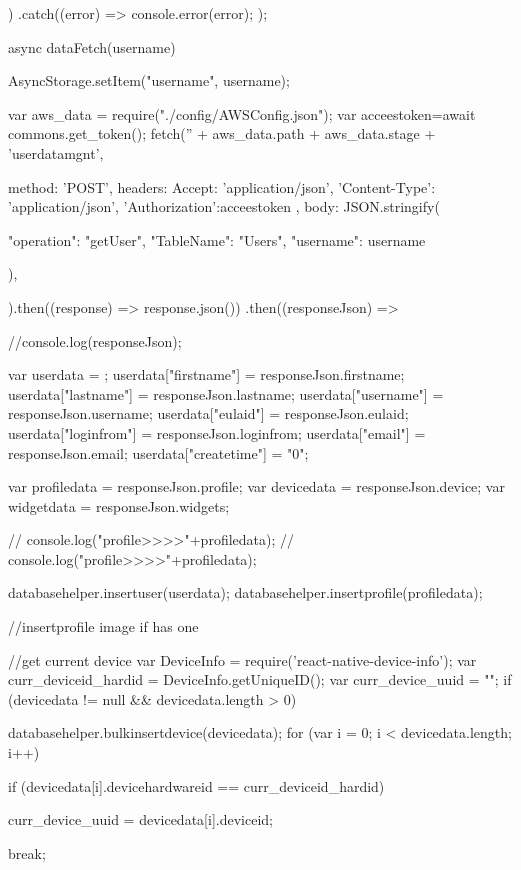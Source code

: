 {{{{{      })
      .catch((error) => {
        console.error(error);
      });
  }

  async dataFetch(username) {

    AsyncStorage.setItem("username", username);

    var aws_data = require("./config/AWSConfig.json");
    var acceestoken=await commons.get_token();
    fetch('' + aws_data.path + aws_data.stage + 'userdatamgnt', {
      method: 'POST',
      headers: {
        Accept: 'application/json',
        'Content-Type': 'application/json',
        'Authorization':acceestoken
      },
      body: JSON.stringify({

        "operation": "getUser",
        "TableName": "Users",
        "username": username

      }),
    }).then((response) => response.json())
      .then((responseJson) => {


        //console.log(responseJson);

        var userdata = {};
        userdata["firstname"] = responseJson.firstname;
        userdata["lastname"] = responseJson.lastname;
        userdata["username"] = responseJson.username;
        userdata["eulaid"] = responseJson.eulaid;
        userdata["loginfrom"] = responseJson.loginfrom;
        userdata["email"] = responseJson.email;
        userdata["createtime"] = "0";


        var profiledata = responseJson.profile;
        var devicedata = responseJson.device;
        var widgetdata = responseJson.widgets;


        // console.log("profile>>>>"+profiledata);
        // console.log("profile>>>>"+profiledata);

        databasehelper.insertuser(userdata);
        databasehelper.insertprofile(profiledata);

        //insertprofile image if has one

        //get current device
        var DeviceInfo = require('react-native-device-info');
        var curr_deviceid_hardid = DeviceInfo.getUniqueID();
        var curr_device_uuid = "";
        if (devicedata != null && devicedata.length > 0) {
          databasehelper.bulkinsertdevice(devicedata);
          for (var i = 0; i < devicedata.length; i++) {

            if (devicedata[i].devicehardwareid == curr_deviceid_hardid) {
              curr_device_uuid = devicedata[i].deviceid;

              break;
            }

}}}}}}}
